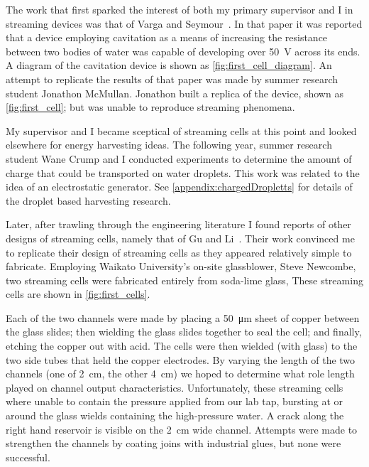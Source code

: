     The work that first sparked the interest of both my primary supervisor and I in streaming devices was that of Varga and Seymour~\cite{Varga1986}.
    In that paper it was reported that a device employing cavitation as a means of increasing the resistance between two bodies of  water was capable of developing over \SI{50}{\volt} across its ends.
    A diagram of the cavitation device is shown as \cref{fig:first_cell_diagram}.
    An attempt to replicate the results of that paper was made by summer research student Jonathon McMullan.
    Jonathon built a replica of the device, shown as \cref{fig:first_cell}; but was unable to reproduce streaming phenomena.

    My supervisor and I became sceptical of streaming cells at this point and looked elsewhere for energy harvesting ideas.
    The following year, summer research student Wane Crump and I conducted experiments to determine the amount of charge that could be transported on water droplets.
    This work was related to the idea of an electrostatic generator.
    See \cref{appendix:chargedDropletts} for details of the droplet based harvesting research.

    Later, after trawling through the engineering literature I found reports of other designs of streaming cells, namely that of Gu and Li~\cite{Gu2000}.
    Their work convinced me to replicate their design of streaming cells as they appeared relatively simple to fabricate.
    Employing Waikato University's on-site glassblower, Steve Newcombe, two streaming cells were fabricated entirely from soda-lime glass,
    These streaming cells are shown in \cref{fig:first_cells}.

    Each of the two channels were made by placing a \SI{50}{\micro\meter} sheet of copper between the glass slides; then wielding the glass slides together to seal the cell; and finally, etching the copper out with acid.
    The cells were then wielded (with glass) to the two side tubes that held the copper electrodes.
    By varying the length of the two channels (one of \SI{2}{\centi\meter}, the other \SI{4}{\centi\meter}) we hoped to determine what role length played on channel output characteristics.
    Unfortunately, these streaming cells where unable to contain the pressure applied from our lab tap, bursting at or around the glass wields containing the high-pressure water.
    A crack along the right hand reservoir is visible on the \SI{2}{\centi\meter} wide channel.
    Attempts were made to strengthen the channels by coating joins with industrial glues, but none were successful.

